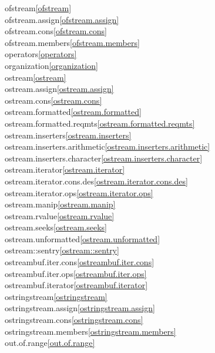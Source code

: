 \begin{multicols}{2}
ofstream\quad\ref{ofstream}\\
ofstream.assign\quad\ref{ofstream.assign}\\
ofstream.cons\quad\ref{ofstream.cons}\\
ofstream.members\quad\ref{ofstream.members}\\
operators\quad\ref{operators}\\
organization\quad\ref{organization}\\
ostream\quad\ref{ostream}\\
ostream.assign\quad\ref{ostream.assign}\\
ostream.cons\quad\ref{ostream.cons}\\
ostream.formatted\quad\ref{ostream.formatted}\\
ostream.formatted.reqmts\quad\ref{ostream.formatted.reqmts}\\
ostream.inserters\quad\ref{ostream.inserters}\\
ostream.inserters.arithmetic\quad\ref{ostream.inserters.arithmetic}\\
ostream.inserters.character\quad\ref{ostream.inserters.character}\\
ostream.iterator\quad\ref{ostream.iterator}\\
ostream.iterator.cons.des\quad\ref{ostream.iterator.cons.des}\\
ostream.iterator.ops\quad\ref{ostream.iterator.ops}\\
ostream.manip\quad\ref{ostream.manip}\\
ostream.rvalue\quad\ref{ostream.rvalue}\\
ostream.seeks\quad\ref{ostream.seeks}\\
ostream.unformatted\quad\ref{ostream.unformatted}\\
ostream::sentry\quad\ref{ostream::sentry}\\
ostreambuf.iter.cons\quad\ref{ostreambuf.iter.cons}\\
ostreambuf.iter.ops\quad\ref{ostreambuf.iter.ops}\\
ostreambuf.iterator\quad\ref{ostreambuf.iterator}\\
ostringstream\quad\ref{ostringstream}\\
ostringstream.assign\quad\ref{ostringstream.assign}\\
ostringstream.cons\quad\ref{ostringstream.cons}\\
ostringstream.members\quad\ref{ostringstream.members}\\
out.of.range\quad\ref{out.of.range}\\

\end{multicols}
